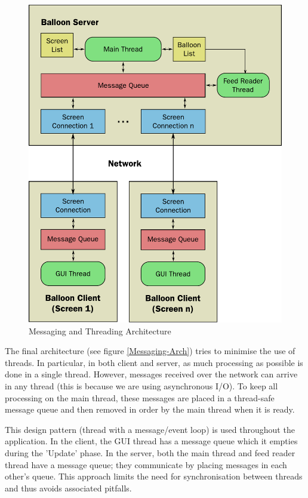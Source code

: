 \begin{figure}
\begin{centering}
\includegraphics[scale=0.95]{Diagrams/messaging}
\par\end{centering}

\caption{Messaging and Threading Architecture}
\label{Messaging-Arch}
\end{figure}

The final architecture (see figure \vref{Messaging-Arch}) tries to minimise the
use of threads. In particular, in both client and server, as much processing as
possible is done in a single thread. However, messages received over the network
can arrive in any thread (this is because we are using asynchronous I/O). To 
keep all processing on the main thread, these messages are placed in a thread-safe
message queue and then removed in order by the main thread when it is ready. 

This design pattern (thread with a message/event loop) is used throughout the
application. In the client, the GUI thread has a message queue which it empties
during the 'Update' phase. In the server, both the main thread and feed reader 
thread have a message queue; they communicate by placing messages in each other's
queue. This approach limits the need for synchronisation between threads and 
thus avoids associated pitfalls.

